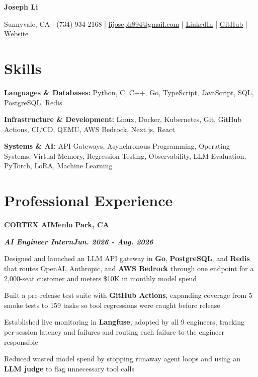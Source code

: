 \documentclass[10pt]{article}
\renewcommand{\resumeheader}[2]{%
  {\centering\fontsize{16}{18}\selectfont\bfseries #1\par}%
  \vspace{4pt}%
  {\centering\fontsize{10.5}{13}\selectfont #2\par}%
  \vspace{6pt}%
}
\renewcommand{\skill}[2]{\textbf{#1:} #2\par\vspace{1.5pt}}
\newcommand{\job}[4]{%
  \vspace{0pt}%
  \textbf{\MakeUppercase{#1}}\hfill\textbf{#2}\par
  \vspace{0.5pt}%
  \textbf{\textit{#3}}\hfill\textbf{\textit{#4}}\par
}
\begin{document}
\resumeheader{Joseph Li}{%
Sunnyvale, CA | (734) 934-2168 | \href{mailto:lijoseph894@gmail.com}{lijoseph894@gmail.com} | \href{https://www.linkedin.com/in/lijoseph894/}{\underline{LinkedIn}} | \href{https://github.com/josephl894}{\underline{GitHub}} | \href{https://josephl894.github.io}{\underline{Website}}}

\section{Skills}
\skill{Languages \& Databases}{Python, C, C++, Go, TypeScript, JavaScript, SQL, PostgreSQL, Redis}
\skill{Infrastructure \& Development}{Linux, Docker, Kubernetes, Git, GitHub Actions, CI/CD, QEMU, AWS Bedrock, Next.js, React}
\skill{Systems \& AI}{API Gateways, Asynchronous Programming, Operating Systems, Virtual Memory, Regression Testing, Observability, LLM Evaluation, PyTorch, LoRA, Machine Learning}

\section{Professional Experience}
\job{Cortex AI}{Menlo Park, CA}{AI Engineer Intern}{Jun. 2026 - Aug. 2026}
\begin{bullets}
  \item Designed and launched an LLM API gateway in \textbf{Go}, \textbf{PostgreSQL}, and \textbf{Redis} that routes OpenAI, Anthropic, and \textbf{AWS Bedrock} through one endpoint for a 2,000-seat customer and meters \$10K in monthly model spend
  \item Built a pre-release test suite with \textbf{GitHub Actions}, expanding coverage from 5 smoke tests to 159 tasks so tool regressions were caught before release
  \item Established live monitoring in \textbf{Langfuse}, adopted by all 9 engineers, tracking per-session latency and failures and routing each failure to the engineer responsible
  \item Reduced wasted model spend by stopping runaway agent loops and using an \textbf{LLM judge} to flag unnecessary tool calls
\end{bullets}
\end{document}
